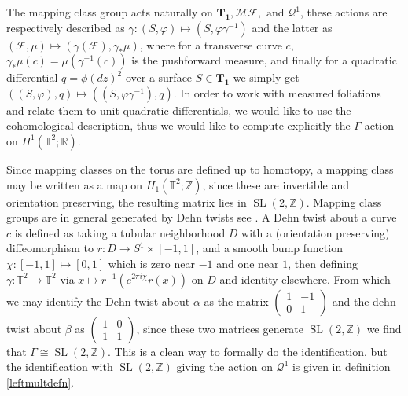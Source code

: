 \documentclass{article}
\newcommand{\tand}{\text{ and }}
\newcommand{\slz}{\operatorname{SL}(2,\mathbb{Z})}
\begin{document}
        The mapping class group acts naturally on \(\mathbf{T_1}, \mathscr{MF}, \tand \mathcal{Q}^1\), these actions are respectively described as \(\gamma: (S,\varphi) \mapsto (S,\varphi \gamma^{-1})\) and the latter as \((\mathcal{F},\mu) \mapsto (\gamma(\mathcal{F}),\gamma_*\mu)\), where for a transverse curve \(c\), \(\gamma_*\mu(c) = \mu(\gamma^{-1}(c))\) is the pushforward measure, and finally for a quadratic differential \(q = \phi(dz)^2\) over a surface \(S\in \mathbf{T_1}\) we simply get \(((S,\varphi),q) \mapsto ((S,\varphi \gamma^{-1}),q)\). In order to work with measured foliations and relate them to unit quadratic differentials, we would like to use the cohomological description, thus we would like to compute explicitly the \(\Gamma\) action on \(H^1(\mathbb{T}^2;\mathbb{R})\).

        Since mapping classes on the torus are defined up to homotopy, a mapping class may be written as a map on \(H_1(\mathbb{T}^2;\mathbb{Z})\), since these are invertible and orientation preserving, the resulting matrix lies in \(\slz\). Mapping class groups are in general generated by Dehn twists see \cite{Martelli_2025}. A Dehn twist about a curve \(c\) is defined as taking a tubular neighborhood \(D\) with a (orientation preserving) diffeomorphism to \(r: D \to S^1 \times [-1,1]\), and a smooth bump function \(\chi: [-1,1] \mapsto [0,1]\) which is zero near \(-1\) and one near \(1\), then defining \(\gamma: \mathbb{T}^2 \to \mathbb{T}^2\) via \(x \mapsto r^{-1}(e^{2\pi i \chi} r(x))\) on \(D\) and identity elsewhere. From which we may identify the Dehn twist about \(\alpha\) as the matrix \(\begin{pmatrix}
            1 & -1 \\ 0 & 1
        \end{pmatrix}\) and the dehn twist about \(\beta\) as \(\begin{pmatrix}
            1 & 0 \\ 1 & 1
        \end{pmatrix}\), since these two matrices generate \(\slz\) we find that \(\Gamma \cong \slz\). This is a clean way to formally do the identification, but the identification with \(\slz\) giving the action on \(\mathcal{Q}^1\) is given in definition \ref{leftmultdefn}.
\end{document}

